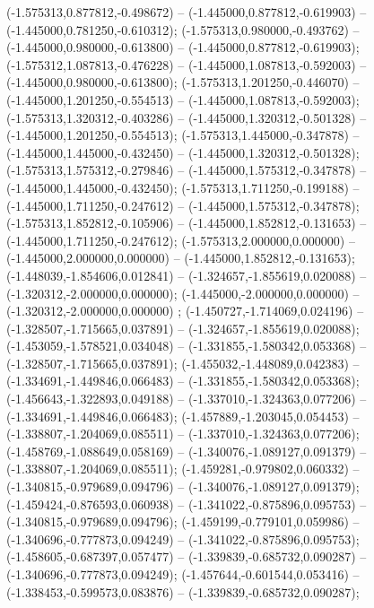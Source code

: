  (-1.575313,0.877812,-0.498672) -- (-1.445000,0.877812,-0.619903) -- (-1.445000,0.781250,-0.610312);
 (-1.575313,0.980000,-0.493762) -- (-1.445000,0.980000,-0.613800) -- (-1.445000,0.877812,-0.619903);
 (-1.575312,1.087813,-0.476228) -- (-1.445000,1.087813,-0.592003) -- (-1.445000,0.980000,-0.613800);
 (-1.575313,1.201250,-0.446070) -- (-1.445000,1.201250,-0.554513) -- (-1.445000,1.087813,-0.592003);
 (-1.575313,1.320312,-0.403286) -- (-1.445000,1.320312,-0.501328) -- (-1.445000,1.201250,-0.554513);
 (-1.575313,1.445000,-0.347878) -- (-1.445000,1.445000,-0.432450) -- (-1.445000,1.320312,-0.501328);
 (-1.575313,1.575312,-0.279846) -- (-1.445000,1.575312,-0.347878) -- (-1.445000,1.445000,-0.432450);
 (-1.575313,1.711250,-0.199188) -- (-1.445000,1.711250,-0.247612) -- (-1.445000,1.575312,-0.347878);
 (-1.575313,1.852812,-0.105906) -- (-1.445000,1.852812,-0.131653) -- (-1.445000,1.711250,-0.247612);
 (-1.575313,2.000000,0.000000) -- (-1.445000,2.000000,0.000000) -- (-1.445000,1.852812,-0.131653);
 (-1.448039,-1.854606,0.012841) -- (-1.324657,-1.855619,0.020088) -- (-1.320312,-2.000000,0.000000);
 (-1.445000,-2.000000,0.000000) -- (-1.320312,-2.000000,0.000000) ;
 (-1.450727,-1.714069,0.024196) -- (-1.328507,-1.715665,0.037891) -- (-1.324657,-1.855619,0.020088);
 (-1.453059,-1.578521,0.034048) -- (-1.331855,-1.580342,0.053368) -- (-1.328507,-1.715665,0.037891);
 (-1.455032,-1.448089,0.042383) -- (-1.334691,-1.449846,0.066483) -- (-1.331855,-1.580342,0.053368);
 (-1.456643,-1.322893,0.049188) -- (-1.337010,-1.324363,0.077206) -- (-1.334691,-1.449846,0.066483);
 (-1.457889,-1.203045,0.054453) -- (-1.338807,-1.204069,0.085511) -- (-1.337010,-1.324363,0.077206);
 (-1.458769,-1.088649,0.058169) -- (-1.340076,-1.089127,0.091379) -- (-1.338807,-1.204069,0.085511);
 (-1.459281,-0.979802,0.060332) -- (-1.340815,-0.979689,0.094796) -- (-1.340076,-1.089127,0.091379);
 (-1.459424,-0.876593,0.060938) -- (-1.341022,-0.875896,0.095753) -- (-1.340815,-0.979689,0.094796);
 (-1.459199,-0.779101,0.059986) -- (-1.340696,-0.777873,0.094249) -- (-1.341022,-0.875896,0.095753);
 (-1.458605,-0.687397,0.057477) -- (-1.339839,-0.685732,0.090287) -- (-1.340696,-0.777873,0.094249);
 (-1.457644,-0.601544,0.053416) -- (-1.338453,-0.599573,0.083876) -- (-1.339839,-0.685732,0.090287);
